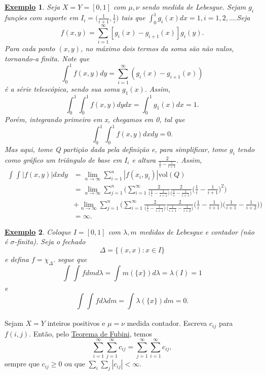 \documentclass{article}
\newtheorem{example}{\underline{Exemplo}}
\begin{document}
 \begin{example}
   Seja \(X = Y = [0, 1]\) com \(\mu, \nu\) sendo medida de Lebesgue. Sejam \(g_{i}\) funções com suporte em \(I_{i} = \biggl(\frac{1}{i+1}, \frac{1}{i}\biggr)\) tais que \(\int_{0}^{1}g_{i}(x)dx = 1, i = 1, 2, \dotsc .\)Seja 
     \[
       f(x, y) = \sum\limits_{i=1}^{\infty}[g_{i}(x)-g_{i+1}(x)]g_{i}(y).
     \]
  Para cada ponto \((x, y)\), no máximo dois termos da soma são não nulos, tornando-a finita. Note que 
    \[
      \int_{0}^{1}f(x, y)dy = \sum\limits_{i=1}^{\infty}(g_{i}(x)-g_{i+1}(x))
    \]
  é a série telescópica, sendo sua soma \(g_1(x).\) Assim, 
    \[
      \int_{0}^{1}\int_{0}^{1}f(x, y)dydx = \int_{0}^{1}g_1(x)dx = 1.
    \]
  Porém, integrando primeiro em x, chegamos em 0, tal que 
    \[
      \int_{0}^{1}\int_{0}^{1}f(x, y)dxdy = 0.
    \]
  Mas aqui, tome Q partição dada pela definição e, para simplificar, tome \(g_{i}\) tendo como gráfico um triângulo de base em \(I_{i}\) e altura \(\frac{2}{\frac{1}{i}-\frac{1}{i+1}}.\) Assim, 
 \begin{align*}
   \int_{}^{}\int_{}^{}|f(x, y)|dxdy &= \lim_{n\to \infty}\sum\limits_{i=1}^{n}|f(x_{i}, y_{i})|\mathrm{vol}(Q) \\ 
                                     &= \lim_{n\to \infty}\sum\limits_{j=1}^{n}\biggl(\sum\limits_{i=1}^{\infty}\frac{2}{\biggl(\frac{1}{i}-\frac{1}{i+1}\biggr)}\frac{2}{\biggl(\frac{1}{i}-\frac{1}{i+1}\biggr)}\biggl(\frac{1}{i}-\frac{1}{i+1}\biggr)^{2}\biggr)\\
                                     &+ \lim_{n\to \infty}\sum\limits_{j=1}^{n}\biggl(\sum\limits_{i=1}^{\infty}\frac{2}{\biggl(\frac{1}{i}-\frac{1}{i+1}\biggr)}\frac{2}{\biggl(\frac{1}{i+1}-\frac{1}{i+2}\biggr)}\biggl(\frac{1}{i}-\frac{1}{i+1}\biggr)\biggl(\frac{1}{i+1}-\frac{1}{i+2}\biggr)\biggr)\\
                                     &= \infty.
 \end{align*}
 \end{example}
\begin{example}
  Coloque \(I=[0, 1]\) com \(\lambda , m\) medidas de Lebesgue e contador (não é \(\sigma \)-finita). Seja o fechado 
    \[
      \Delta = \{(x, x): x\in I\}
    \]
  e defina \(f=\chi_{\Delta }.\) segue que 
    \[
      \int_{}^{}\int_{}^{}fdmd\lambda = \int_{}^{}m(\{x\})d\lambda = \lambda (I) = 1
    \]
  e 
    \[
      \int_{}^{}\int_{}^{}fd\lambda dm = \int_{}^{}\lambda (\{x\})dm = 0.
    \]
\end{example}
  Sejam \(X = Y\) inteiros positivos e \(\mu  = \nu\) medida contador. Escreva \(c_{ij}\) para \(f(i, j).\) Então, pelo \hyperlink{fubini_tonelli}{Teorema de Fubini}, temos 
    \[
      \sum\limits_{i=1}^{\infty}\sum\limits_{j=1}^{\infty}c_{ij} = \sum\limits_{j=1}^{\infty}\sum\limits_{i=1}^{\infty}c_{ij},
    \]
  sempre que \(c_{ij}\geq 0\) ou que \(\sum\limits_{i}^{}\sum\limits_{j}^{}|c_{ij}| < \infty\).
\end{document}
